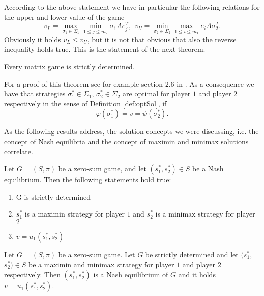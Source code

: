 According to the above statement we have in particular the following relations for the upper and lower value of the game
\begin{equation*}
    v_{L} = \max_{\sigma_{1}\in\Sigma_{1}}\min_{1\leq j\leq m_{2}}\sigma_{1} Ae_{j}^{T}, ~~ 
        v_{U} = \min_{\sigma_{2}\in\Sigma_{2}}\max_{1\leq i\leq m_{1}}e_{i} A\sigma_{2}^{T}.
\end{equation*}
Obviously it holds $v_{L}\leq v_{U}$, but it is not that obvious that also the reverse inequality holds true. This is the statement of the next theorem.

\begin{theorem}
    Every matrix game is strictly determined.
\end{theorem}

For a proof of this theorem see for example section 2.6 in \cite{gonzalez2010introductory}. As a consequence we have that strategies $\sigma_{1}^{*}\in\Sigma_{1}$,
$\sigma_{2}^{*}\in\Sigma_{2}$ are optimal for player $1$ and player $2$ respectively in the sense of Definition \ref{def:optSol}, if 
\begin{equation*}
    \varphi(\sigma_{1}^{*}) = v = \psi(\sigma_{2}^{*}).
\end{equation*}

As the following results address, the solution concepts we were discussing, i.e. the concept of Nash equilibria and the concept of maximin and minimax solutions correlate.

\begin{proposition}
    Let $G = (S, \pi)$ be a zero-sum game, and let $(s_{1}^{*}, s_{2}^{*})\in S$ be a Nash equilibrium. Then the following statements hold true:
    \begin{enumerate}
        \item G is strictly determined 
        \item $s_{1}^{*}$ is a maximin strategy for player $1$ and $s_{2}^{*}$ is a minimax strategy for player $2$
        \item $v = u_{1}(s_{1}^{*}, s_{2}^{*})$
    \end{enumerate}
\end{proposition}

\begin{proposition}\label{prop:minimaxNash}
    Let $G = (S, \pi)$ be a zero-sum game. Let $G$ be strictly determined and let $(s_{1}^{*}$, $s_{2}^{*})\in S$ be a maximin and minimax strategy 
    for player $1$ and player $2$ respectively. Then $(s_{1}^{*}, s_{2}^{*})$ is a Nash equilibrium of $G$ and it holds $v = u_{1}(s_{1}^{*}, s_{2}^{*})$.
\end{proposition}


